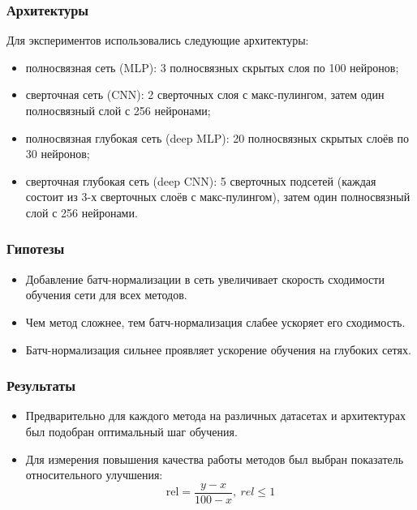 \documentclass{beamer}
\begin{document}
\begin{frame}
	\frametitle{Архитектуры}
Для экспериментов использовались следующие архитектуры:
\begin{itemize}
\item полносвязная сеть (MLP): 3 полносвязных скрытых слоя по 100 нейронов;
\item сверточная сеть (CNN): 2 сверточных слоя с макс-пулингом, затем один полносвязный слой с 256 нейронами;
\item полносвязная глубокая сеть (deep MLP):  20 полносвязных скрытых слоёв по 30 нейронов;
\item сверточная глубокая сеть (deep CNN): 5 сверточных подсетей (каждая состоит из 3-х сверточных слоёв с макс-пулингом), затем один полносвязный слой с 256 нейронами.
\end{itemize}
\end{frame}


\begin{frame}
	\frametitle{Гипотезы}
	
\begin{itemize}
\item Добавление батч-нормализации в сеть увеличивает скорость сходимости обучения сети для всех методов.
\item Чем метод сложнее, тем батч-нормализация слабее ускоряет его сходимость.
\item Батч-нормализация сильнее проявляет ускорение обучения на глубоких сетях.
\end{itemize}

\end{frame}

\begin{frame}
	\frametitle{Результаты}
	
\begin{itemize}
\item Предварительно для каждого метода на различных датасетах и архитектурах был подобран оптимальный шаг обучения.
\item Для измерения повышения качества работы методов был выбран показатель относительного улучшения:
\begin{equation}
\mathrm{rel} = \frac{y - x}{100 - x},\ rel \leq 1
\end{equation}
\end{itemize}

\end{frame}

\end{document}
